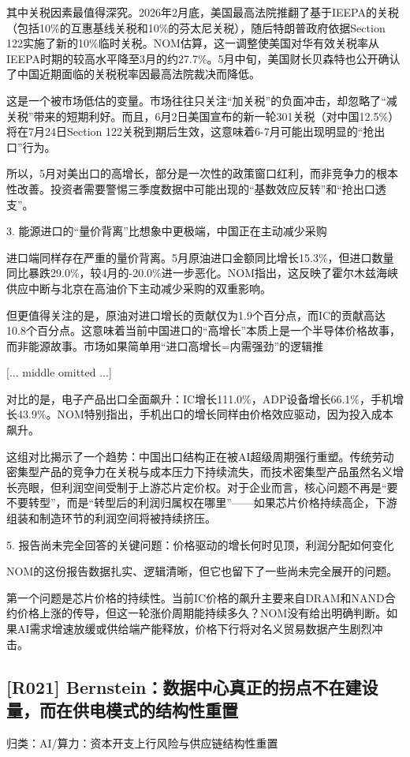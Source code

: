\documentclass[11pt]{ctexart}
\begin{document}
其中关税因素最值得深究。2026年2月底，美国最高法院推翻了基于IEEPA的关税（包括10\%的互惠基线关税和10\%的芬太尼关税），随后特朗普政府依据Section 122实施了新的10\%临时关税。NOM估算，这一调整使美国对华有效关税率从IEEPA时期的较高水平降至3月的约27.7\%。5月中旬，美国财长贝森特也公开确认了中国近期面临的关税税率因最高法院裁决而降低。

这是一个被市场低估的变量。市场往往只关注“加关税”的负面冲击，却忽略了“减关税”带来的短期利好。而且，6月2日美国宣布的新一轮301关税（对中国12.5\%）将在7月24日Section 122关税到期后生效，这意味着6-7月可能出现明显的“抢出口”行为。

所以，5月对美出口的高增长，部分是一次性的政策窗口红利，而非竞争力的根本性改善。投资者需要警惕三季度数据中可能出现的“基数效应反转”和“抢出口透支”。

3. 能源进口的“量价背离”比想象中更极端，中国正在主动减少采购

进口端同样存在严重的量价背离。5月原油进口金额同比增长15.3\%，但进口数量同比暴跌29.0\%，较4月的-20.0\%进一步恶化。NOM指出，这反映了霍尔木兹海峡供应中断与北京在高油价下主动减少采购的双重影响。

但更值得关注的是，原油对进口增长的贡献仅为1.9个百分点，而IC的贡献高达10.8个百分点。这意味着当前中国进口的“高增长”本质上是一个半导体价格故事，而非能源故事。市场如果简单用“进口高增长=内需强劲”的逻辑推

[... middle omitted ...]

对比的是，电子产品出口全面飙升：IC增长111.0\%，ADP设备增长66.1\%，手机增长43.9\%。NOM特别指出，手机出口的增长同样由价格效应驱动，因为投入成本飙升。

这组对比揭示了一个趋势：中国出口结构正在被AI超级周期强行重塑。传统劳动密集型产品的竞争力在关税与成本压力下持续流失，而技术密集型产品虽然名义增长亮眼，但利润空间受制于上游芯片定价权。对于企业而言，核心问题不再是“要不要转型”，而是“转型后的利润归属权在哪里”——如果芯片价格持续高企，下游组装和制造环节的利润空间将被持续挤压。

5. 报告尚未完全回答的关键问题：价格驱动的增长何时见顶，利润分配如何变化

NOM的这份报告数据扎实、逻辑清晰，但它也留下了一些尚未完全展开的问题。

第一个问题是芯片价格的持续性。当前IC价格的飙升主要来自DRAM和NAND合约价格上涨的传导，但这一轮涨价周期能持续多久？NOM没有给出明确判断。如果AI需求增速放缓或供给端产能释放，价格下行将对名义贸易数据产生剧烈冲击。

\subsection{[R021] Bernstein：数据中心真正的拐点不在建设量，而在供电模式的结构性重置}
{\small\color{refgray}归类：AI/算力：资本开支上行风险与供应链结构性重置}
\end{document}
